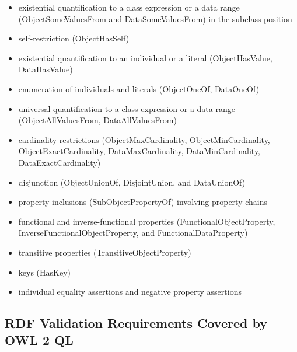 \documentclass{llncs}
\begin{document}
\begin{itemize}
	\item existential quantification to a class expression or a data range (ObjectSomeValuesFrom and DataSomeValuesFrom) in the subclass position
  \item self-restriction (ObjectHasSelf)
  \item existential quantification to an individual or a literal (ObjectHasValue, DataHasValue)
  \item enumeration of individuals and literals (ObjectOneOf, DataOneOf)
  \item universal quantification to a class expression or a data range (ObjectAllValuesFrom, DataAllValuesFrom)
  \item cardinality restrictions (ObjectMaxCardinality, ObjectMinCardinality, ObjectExactCardinality, DataMaxCardinality, DataMinCardinality, DataExactCardinality)
  \item disjunction (ObjectUnionOf, DisjointUnion, and DataUnionOf)
  \item property inclusions (SubObjectPropertyOf) involving property chains
  \item functional and inverse-functional properties (FunctionalObjectProperty, InverseFunctionalObjectProperty, and FunctionalDataProperty)
  \item transitive properties (TransitiveObjectProperty)
  \item keys (HasKey)
  \item individual equality assertions and negative property assertions
\end{itemize}

\subsection{RDF Validation Requirements Covered by OWL 2 QL}
\end{document}

